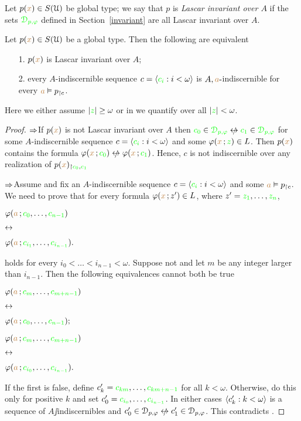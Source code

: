 \documentclass[creche.tex]{subfiles}
\begin{document}
Let $p({\color{brown} x})\in S(\EuScript U)$ be global type; we say that $p$ is \emph{Lascar invariant over $A$\/} if the sets ${\color{green}\EuScript D_{p,\varphi}}$ defined in Section~\ref{invariant} are all Lascar invariant over $A$.

\begin{proposition}\label{prop_Lascar_indiscernibles}
  Let $p({\color{brown} x})\in S(\EuScript U)$ be a global type. Then the following are equivalent
  \begin{itemize}
    \item[1.] $p({\color{brown} x})$ is Lascar invariant over $A$;
    \item[2.] every $A$-indiscernible sequence $c=\langle{\color{green}c_i}:i<\omega\rangle$ is $A,{\color{brown} a}\mbox{-}$indiscernible for every ${\color{brown} a}\vDash p_{\restriction c}$.
  \end{itemize}
  Here we either assume $|{\color{green} z}|\ge\omega$ or in  we quantify over all $|{\color{green} z}|<\omega$.
\end{proposition}
\begin{proof}

  \def\ceq#1#2#3{\parbox[t]{30ex}{$\displaystyle #1$}\parbox[t]{5ex}{$\displaystyle\hfil #2$}{$\displaystyle #3$}}
  $\Rightarrow$\quad If $p({\color{brown} x})$ is not Lascar invariant over $A$ then ${\gr c_0}\in{\gr\D_{p,\phi}}\niff {\gr c_1}\in{\gr\D_{p,\phi}}$ for some $A$-indiscernible sequence $c=\langle{\color{green}c_i}:i<\omega\rangle$ and some $\varphi({\color{brown} x}\,;{\color{green} z})\in L$. Then $p({\color{brown} x})$ contains the formula $\phi({\mr x}\,;{\gr c_0})\niff \phi({\mr x}\,;{\gr c_1})$. Hence, $c$ is not indiscernible over any realization of $p({\color{brown} x})_{\restriction{\color{green}c_0},{\color{green} c_1}}$ 

  $\Rightarrow$\quad Assume  and fix an $A$-indiscernible sequence $c=\langle{\color{green}c_i}:i<\omega\rangle$ and some ${\color{brown} a}\vDash p_{\restriction c}$. We need to prove that for every formula $\varphi({\color{brown} x}\,;z')\in L$, where $z'={\color{green} z_1},\dots,{\color{green} z_n}$, 

  \ceq{\hfill\phi({\mr a}\,;{\gr c_{0}},\dots,{\gr c_{n-1}})}{\iff}{\phi({\mr a}\,;{\gr c_{i_1}},\dots,{\gr c_{i_{n-1}}}).}

  holds for every $i_0<\dots<i_{n-1}<\omega$. Suppose not and let $m$ be any integer larger than $i_{n-1}$. Then the following equivalences cannot both be true

  \ceq{\hfill\phi({\mr a}\,;{\gr c_m},\dots,{\gr c_{m+n-1}})}{\iff}{\phi({\mr a}\,;{\gr c_0},\dots,{\gr c_{n-1}});}


  \ceq{\hfill\phi({\mr a}\,;{\gr c_m},\dots,{\gr c_{m+n-1}})}{\iff}{\phi({\mr a}\,;{\gr c_{i_0}},\dots,{\gr c_{i_{n-1}}}).}

  If the first is false, define $c'_k={\color{green} c_{km}},\dots,{\color{green} c_{km+n-1}}$ for all $k<\omega$. Otherwise, do this only for positive $k$ and set $c'_0={\color{green} c_{i_0}},\dots,{\color{green} c_{i_{n-1}}}$. In either cases $\langle c'_k:k<\omega\rangle$ is a sequence of $A\jj$in\-dis\-cern\-i\-bles and $c'_0\in\D_{p,\phi}\niff c'_1\in\D_{p,\phi}$. This contradicts .
\end{proof}
\end{document}
